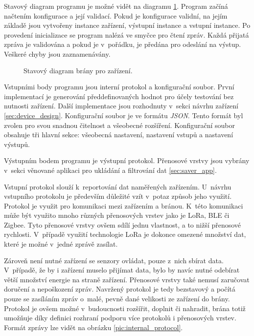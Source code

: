 Stavový diagram programu je možné vidět na diagramu \ref{dia:gateway_state_diagram}. Program začíná načtením konfigurace a její validací. Pokud je konfigurace validní, na jejím základě jsou vytvořeny instance zařízení, výstupní instance a vstupní instance. Po provedení inicializace se program nalézá ve smyčce pro čtení zpráv. Každá přijatá zpráva je validována a pokud je v~pořádku, je předána pro odeslání na výstup. Veškeré chyby jsou zaznamenávány.

\begin{figure}[ht]
  \centering
  
  \caption{Stavový diagram brány pro zařízení.}
  \label{dia:gateway_state_diagram}
\end{figure}

Vstupními body programu jsou interní protokol a konfigurační soubor. První implementací je generování předdefinovaných hodnot pro účely testování bez nutnosti zařízení. Další implementace jsou rozhodnuty v~sekci návrhu zařízení \ref{sec:device_design}. Konfigurační soubor je ve formátu \textit{JSON}. Tento formát byl zvolen pro svou snadnou čitelnost a všeobecné rozšíření. Konfigurační soubor obsahuje tři hlavní sekce: všeobecná nastavení, nastavení vstupů a nastavení výstupů.

Výstupním bodem programu je výstupní protokol. Přenosové vrstvy jsou vybrány v~sekci věnované aplikaci pro ukládání a filtrování dat \ref{sec:saver_app}.

 \label{sec:input_protocol}
Vstupní protokol slouží k~reportování dat naměřených zařízením. U~návrhu vstupního protokolu je především důležité vzít v~potaz způsob jeho využití. Protokol je využit pro komunikaci mezi zařízením a bránou. K~této komunikaci může být využito mnoho různých přenosových vrstev jako je LoRa, BLE či Zigbee. Tyto přenosové vrstvy ovšem sdílí jednu vlastnost, a to nižší přenosové rychlosti. V~případě využití technologie LoRa je dokonce omezené množství dat, které je možné v~jedné zprávě zasílat. 

Zároveň není nutné zařízení se senzory ovládat, pouze z~nich sbírat data. V~případě, že by i zařízení muselo přijímat data, bylo by navíc nutné odebírat větší množství energie na straně zařízení. Přenosové vrstvy také nemusí zaručovat doručení a nepoškození zpráv. Navržený protokol je tedy bezstavový a počítá pouze se zasíláním zpráv o~malé, pevně dané velikosti ze zařízení do brány. Protokol je ovšem možné v~budoucnosti rozšířit, doplnit či nahradit, brána totiž umožňuje díky definici rozhraní podporu více protokolů i přenosových vrstev. Formát zprávy lze vidět na obrázku \ref{pic:internal_protocol}.

